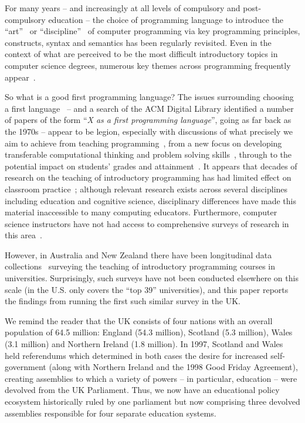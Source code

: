 \documentclass[english,submission]{programming}
\begin{document}
For many years -- and increasingly at all levels of compulsory and
post-compulsory education -- the choice of programming language to
introduce the ``art''~\cite{knuth:2011} or
``discipline''~\cite{dijkstra:1976} of computer programming via key
programming principles, constructs, syntax and semantics has been
regularly revisited. Even in the context of what are perceived to be
the most difficult introductory topics in computer science degrees,
numerous key themes across programming frequently
appear~\cite{dale:2006}.

So what is a good first programming language? The issues surrounding
choosing a first language~\cite{gupta:2004,kaplan:2010} -- and a
search of the ACM Digital Library identified a number of papers of the
form ``{\emph{X as a first programming language}}'', going as far back
as the 1970s -- appear to be legion, especially with discussions of
what precisely we aim to achieve from teaching
programming~\cite{fincher:1999,schult+bennedsen:2006}, from a new
focus on developing transferable computational thinking and problem
solving skills~\cite{wing:2008}, through to the potential impact on
students' grades and
attainment~\cite{simon-et-al:2006,bergin+reilly:2006,porter-et-al:2013,ivanovic-et-al:2015}. It
appears that decades of research on the teaching of introductory
programming has had limited effect on classroom
practice~\cite{pears-et-al:2007}; although relevant research exists
across several disciplines including education and cognitive science,
disciplinary differences have made this material inaccessible to many
computing educators. Furthermore, computer science instructors have
not had access to comprehensive surveys of research in this
area~\cite{mccracken-et-al:2001,pears-et-al:2007}.

However, in Australia and New Zealand there have been longitudinal
data
collections~\cite{deraadt-et-al:2004,mason-et-al:2012,mason+cooper:2014}
surveying the teaching of introductory programming courses in
universities. Surprisingly, such surveys have not been conducted
elsewhere on this scale (in the U.S. \cite{guo:2014} only covers the ``top 39'' universities), and this paper reports the findings from
running the first such similar survey in the UK.

We remind the reader that the UK consists of four nations with an
overall population of 64.5 million: England (54.3 million), Scotland
(5.3 million), Wales (3.1 million) and Northern Ireland (1.8
million). In 1997, Scotland and Wales held referendums which
determined in both cases the desire for increased self-government
(along with Northern Ireland and the 1998 Good Friday Agreement),
creating assemblies to which a variety of powers -- in particular,
education -- were devolved from the UK Parliament. Thus, we now have
an educational policy ecosystem historically ruled by one parliament
but now comprising three devolved assemblies responsible for four
separate education systems.
\end{document}

